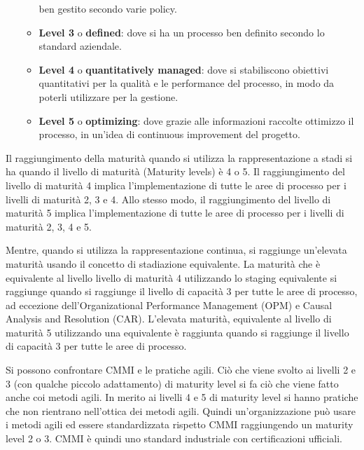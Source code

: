 \begin{enumerate}
\begin{itemize}
                        ben gestito secondo varie policy.
                  \item \textbf{Level 3} o \textbf{defined}: dove si ha un processo
                        ben definito secondo lo standard aziendale.
                  \item \textbf{Level 4} o \textbf{quantitatively managed}: dove
                        si stabiliscono obiettivi quantitativi per la qualità e
                        le performance del processo, in modo da poterli utilizzare
                        per la gestione.
                  \item \textbf{Level 5} o \textbf{optimizing}: dove grazie alle
                        informazioni raccolte ottimizzo il processo, in un'idea di
                        continuous improvement del progetto.
            \end{itemize}
\end{enumerate}
Il raggiungimento della maturità quando si utilizza la rappresentazione a stadi
si ha quando il livello di maturità (Maturity levels) è 4 o 5. Il raggiungimento
del livello di maturità 4 implica l'implementazione di tutte le aree di processo
per i livelli di maturità 2, 3 e 4. Allo stesso modo, il raggiungimento del livello
di maturità 5 implica l'implementazione di tutte le aree di processo per i
livelli di maturità 2, 3, 4 e 5.
 
Mentre, quando si utilizza la rappresentazione continua, si raggiunge un'elevata
maturità usando il concetto di stadiazione equivalente. La maturità che è
equivalente al livello livello di maturità 4 utilizzando lo staging equivalente
si raggiunge quando si raggiunge il livello di capacità 3 per tutte le aree di
processo, ad eccezione dell'Organizational Performance Management (OPM) e Causal
Analysis and Resolution (CAR). L'elevata maturità, equivalente al livello di
maturità 5 utilizzando una equivalente è raggiunta quando si raggiunge il livello
di capacità 3 per tutte le aree di processo.

Si possono confrontare CMMI e le pratiche agili. Ciò che viene svolto ai livelli
2 e 3 (con qualche piccolo adattamento) di maturity level si fa ciò che viene
fatto anche coi metodi agili. In merito ai livelli 4 e 5 di maturity level si hanno
pratiche che non rientrano nell'ottica dei metodi agili. Quindi un'organizzazione
può usare i metodi agili ed essere standardizzata rispetto CMMI raggiungendo
un maturity level 2 o 3. CMMI è quindi uno standard industriale con certificazioni
ufficiali.